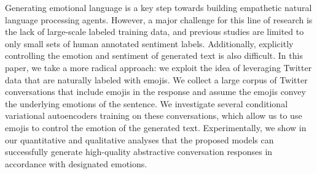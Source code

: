 Generating emotional language is a key step towards building empathetic natural language processing agents. However, a major challenge for this line of research is the lack of large-scale labeled training data, and previous studies are limited to only small sets of human annotated sentiment labels. Additionally, explicitly controlling the emotion and sentiment of generated text is also difficult. In this paper, we take a more radical approach: we exploit the idea of leveraging Twitter data that are naturally labeled with emojis. We collect a large corpus of Twitter conversations that include emojis in the response and assume the emojis convey the underlying emotions of the sentence. We investigate several conditional variational autoencoders training on these conversations, which allow us to use emojis to control the emotion of the generated text. Experimentally, we show in our quantitative and qualitative analyses that the proposed models can successfully generate high-quality abstractive conversation responses in accordance with designated emotions.
